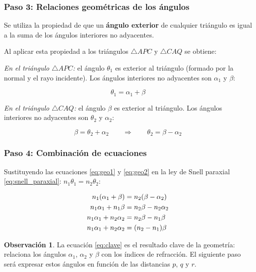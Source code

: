 \documentclass[12pt, a4paper]{article}
\theoremstyle{definition}
\newtheorem{observacion}{Observación}[section]
\begin{document}
\subsubsection*{Paso 3: Relaciones geométricas de los ángulos}

Se utiliza la propiedad de que un \textbf{ángulo exterior} de cualquier triángulo es igual
a la suma de los ángulos interiores no adyacentes.

Al aplicar esta propiedad a los triángulos \(\triangle APC\) y \(\triangle CAQ\) se
obtiene:

\textit{En el triángulo \(\triangle APC\):} el ángulo \(\theta_1\) es exterior al
triángulo (formado por la normal y el rayo incidente). Los ángulos interiores no
adyacentes son \(\alpha_1\) y \(\beta\):

\begin{equation}
  \theta_1 = \alpha_1 + \beta
  \label{eq:geo1}
\end{equation}

\textit{En el triángulo \(\triangle CAQ\):} el ángulo \(\beta\) es exterior al triángulo.
Los ángulos interiores no adyacentes son \(\theta_2\) y \(\alpha_2\):

\begin{equation}
  \beta = \theta_2 + \alpha_2 \qquad \Longrightarrow \qquad \theta_2 = \beta - \alpha_2
  \label{eq:geo2}
\end{equation}

\subsubsection*{Paso 4: Combinación de ecuaciones}

Sustituyendo las ecuaciones \eqref{eq:geo1} y \eqref{eq:geo2} en la ley de Snell paraxial
\eqref{eq:snell_paraxial}: \(n_1\theta_1 = n_2\theta_2\):

\begin{align}
  n_1(\alpha_1 + \beta) &= n_2(\beta - \alpha_2) \notag \\
  n_1\alpha_1 + n_1\beta &= n_2\beta - n_2\alpha_2 \notag \\
  n_1\alpha_1 + n_2\alpha_2 &= n_2\beta - n_1\beta \notag \\
  n_1\alpha_1 + n_2\alpha_2 &= (n_2 - n_1)\beta
  \label{eq:clave}
\end{align}

\begin{observacion}
La ecuación \eqref{eq:clave} es el resultado clave de la geometría: relaciona los ángulos
\(\alpha_1\), \(\alpha_2\) y \(\beta\) con los índices de refracción. El siguiente paso
será expresar estos ángulos en función de las distancias \(p\), \(q\) y \(r\).
\end{observacion}
\end{document}
